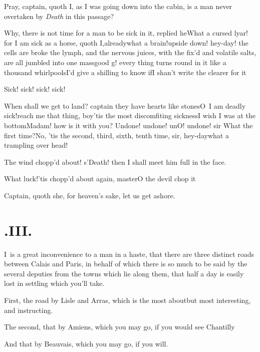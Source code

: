 \documentclass{article}
\begin{document}
Pray, captain, quoth I, as I was going down into the cabin, is a man never overtaken
by \textit{Death} in this passage?

Why, there is not time for a man to be\break
sick in it, replied he\tsh What a cursed\break
lyar! for I am sick as a horse, quoth I,\break already\tsh what a brain!\tsh upside down!\tsh
hey-day! the cells are broke  the lymph,
and the nervous juices, with the fix’d and volatile salts, are all jumbled into one
mass\tsh good \hbox{g\tsk!} every thing turns round in it like a thousand whirl\-pools\tsh I’d
give a shilling to know if\break I shan’t write the clearer for it\tsh

Sick! sick! sick! sick!\tsh{}

\tsk When shall we get to land? captain\break
\tsk they have hearts like stones\tsh O~I\break
am deadly sick!\tsh reach me that thing, boy\tsh ’tis the most discomfiting sickness\tsh I wish I
was at the bottom\tsk Madam! how is it with you? Undone! undone! un\tsh O! undone!  sir
\tsh What the first time?\tsh No, ’tis the second, third, sixth, tenth time, sir,\tsh
hey-day\tsk what a trampling over head!\break
{}

The wind chopp’d about! s’Death!\tsk\break
then I shall meet him full in the face.

What luck!\tsk ’tis chopp’d about again, master\tsh O the devil chop it\tsh

Captain, quoth she, for heaven’s sake, let us get ashore.

\vfill{}\eject
\section{.\enspace III.}

\lettrine{I}{\,} is a great inconvenience to a man in a haste, that there are three
distinct roads between Calais and Paris, in behalf of which there
is so much to be said by the several deputies from the towns which lie along them,
that half a day is easily lost in settling which you’ll take.

First, the road by Lisle and Arras, which is the
most about\tsh but most interesting, and instructing.

The second, that by Amiens, which you may go, if you
would see Chantilly\tsh

And that by Beauvais, which you may go, if you will.
\end{document}
